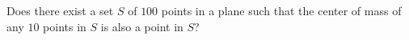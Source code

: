 Does there exist a set $S$ of $100$ points in a plane such that the center of mass of any $10$ points in $S$ is also a point in $S$?